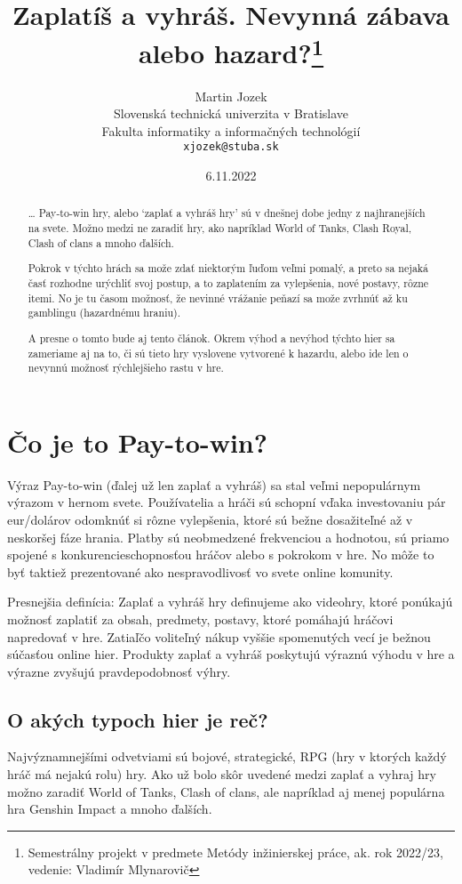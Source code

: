 \documentclass[10pt,twoside,slovak,a4paper]{article}
\title{Zaplatíš a vyhráš. Nevynná zábava alebo hazard?\thanks{Semestrálny projekt v predmete Metódy inžinierskej práce, ak. rok 2022/23, vedenie: Vladimír Mlynarovič}} %
\author{Martin Jozek\\[2pt]
	{\small Slovenská technická univerzita v Bratislave}\\
	{\small Fakulta informatiky a informačných technológií}\\
	{\small \texttt{xjozek@stuba.sk}}
	}
\date{\small 6.11.2022} %
\begin{document}
\maketitle

\begin{abstract}
\ldots
Pay-to-win hry, alebo ‘zaplať a vyhráš hry’ sú v dnešnej dobe jedny z najhranejších na svete. Možno medzi ne zaradiť hry, ako napríklad World of Tanks, Clash Royal, Clash of clans a mnoho ďalších.

Pokrok v týchto hrách sa može zdať niektorým ľuďom veľmi pomalý, a preto sa nejaká časť rozhodne urýchliť svoj postup, a to zaplatením za vylepšenia, nové postavy, rôzne itemi. No je tu časom možnosť, že nevinné vrážanie peňazí sa može zvrhnúť až ku gamblingu (hazardnému hraniu). 

A presne o tomto bude aj tento článok. Okrem výhod a nevýhod týchto hier sa zameriame aj na to, či sú tieto hry vyslovene vytvorené k hazardu, alebo ide len o nevynnú možnosť rýchlejšieho rastu v hre.
\end{abstract}


\section{Čo je to Pay-to-win?} \label{2}
Výraz Pay-to-win (ďalej už len zaplať a vyhráš)  sa stal veľmi nepopulárnym výrazom v hernom svete. Používatelia a hráči sú schopní vďaka investovaniu pár eur/dolárov odomknúť si rôzne vylepšenia, ktoré sú bežne dosažiteľné až v neskoršej fáze hrania. Platby sú neobmedzené frekvenciou a hodnotou, sú priamo spojené s konkurencieschopnosťou hráčov alebo s pokrokom v hre. No môže to byť taktiež prezentované ako nespravodlivosť vo svete online komunity.

Presnejšia definícia:
Zaplať a vyhráš hry definujeme ako videohry, ktoré ponúkajú možnosť zaplatiť za obsah, predmety, postavy, ktoré pomáhajú hráčovi napredovať v hre. Zatiaľčo voliteľný nákup vyššie spomenutých vecí je bežnou súčasťou online hier. Produkty zaplať a vyhráš poskytujú výraznú   výhodu v hre a výrazne zvyšujú pravdepodobnosť výhry.\cite{1}

\subsection{O akých typoch hier je reč?} \label{2.1}
Najvýznamnejšími odvetviami sú bojové, strategické, RPG (hry v ktorých každý hráč má nejakú rolu) hry. Ako už bolo skôr uvedené  medzi zaplať a vyhraj hry možno zaradiť World of Tanks, Clash of clans, ale napríklad aj menej populárna hra Genshin Impact a mnoho ďalších.
\end{document}
